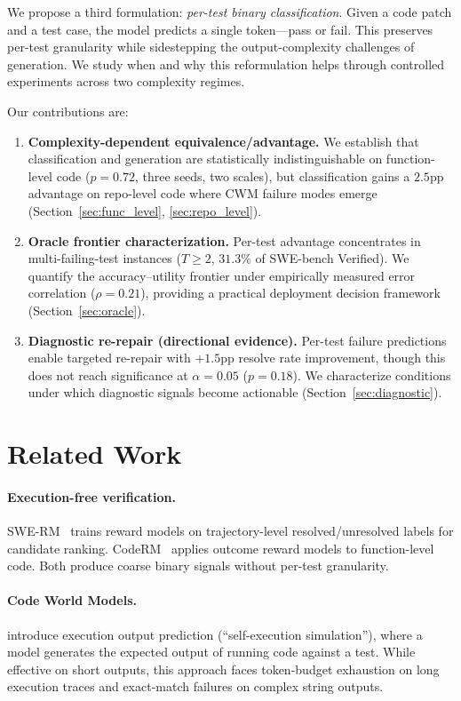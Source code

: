 \documentclass[11pt,a4paper]{article}
\begin{document}
We propose a third formulation: \emph{per-test binary classification}. Given a code patch and a test case, the model predicts a single token---pass or fail. This preserves per-test granularity while sidestepping the output-complexity challenges of generation. We study when and why this reformulation helps through controlled experiments across two complexity regimes.

Our contributions are:
\begin{enumerate}[nosep,leftmargin=*]
\item \textbf{Complexity-dependent equivalence/advantage.} We establish that classification and generation are statistically indistinguishable on function-level code ($p{=}0.72$, three seeds, two scales), but classification gains a $2.5$pp advantage on repo-level code where CWM failure modes emerge (Section~\ref{sec:func_level}, \ref{sec:repo_level}).
\item \textbf{Oracle frontier characterization.} Per-test advantage concentrates in multi-failing-test instances ($T{\geq}2$, $31.3\%$ of SWE-bench Verified). We quantify the accuracy--utility frontier under empirically measured error correlation ($\rho{=}0.21$), providing a practical deployment decision framework (Section~\ref{sec:oracle}).
\item \textbf{Diagnostic re-repair (directional evidence).} Per-test failure predictions enable targeted re-repair with $+1.5$pp resolve rate improvement, though this does not reach significance at $\alpha{=}0.05$ ($p{=}0.18$). We characterize conditions under which diagnostic signals become actionable (Section~\ref{sec:diagnostic}).
\end{enumerate}

\section{Related Work}
\label{sec:related}

\paragraph{Execution-free verification.}
SWE-RM~\citep{sweagentreward2025} trains reward models on trajectory-level resolved/unresolved labels for candidate ranking. CodeRM~\citep{coderm2024} applies outcome reward models to function-level code. Both produce coarse binary signals without per-test granularity.

\paragraph{Code World Models.}
\citet{self_execution2024} introduce execution output prediction (``self-execution simulation''), where a model generates the expected output of running code against a test. While effective on short outputs, this approach faces token-budget exhaustion on long execution traces and exact-match failures on complex string outputs.
\end{document}
